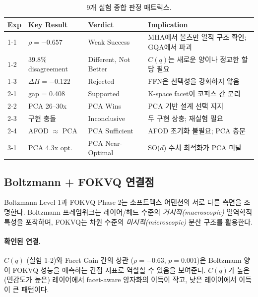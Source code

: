 \documentclass[11pt,a4paper]{article}
\begin{document}
\begin{table}[H]
\centering
\caption{9개 실험 종합 판정 매트릭스.}
\label{tab:verdict}
\begin{tabularx}{\textwidth}{ll>{\raggedright\arraybackslash}p{2.8cm}>{\raggedright\arraybackslash}X}
\toprule
\textbf{Exp} & \textbf{Key Result} & \textbf{Verdict} & \textbf{Implication} \\
\midrule
1-1 & $\rho = -0.657$ & \textcolor{partial}{Weak Success} & MHA에서 볼츠만 열적 구조 확인; GQA에서 파괴 \\
1-2 & 39.8\% disagreement & \textcolor{partial}{Different, Not Better} & $C(q)$는 새로운 양이나 정교한 할당 필요 \\
1-3 & $\Delta H = -0.122$ & \textcolor{failure}{Rejected} & FFN은 선택성을 강화하지 않음 \\
2-1 & gap = 0.408 & \textcolor{success}{Supported} & K-space facet이 코퍼스 간 분리 \\
2-2 & PCA 26--30x & \textcolor{success}{PCA Wins} & PCA 기반 설계 선택 지지 \\
2-3 & 구현 충돌 & \textcolor{partial}{Inconclusive} & 두 구현 상충; 재실험 필요 \\
2-4 & AFOD $\approx$ PCA & \textcolor{success}{PCA Sufficient} & AFOD 초기화 불필요; PCA 충분 \\
3-1 & PCA 4.3x opt. & \textcolor{success}{PCA Near-Optimal} & SO($d$) 수치 최적화가 PCA 미달 \\
\bottomrule
\end{tabularx}
\end{table}

\subsection{Boltzmann + FOKVQ 연결점}

Boltzmann Level 1과 FOKVQ Phase 2는 소프트맥스 어텐션의 서로 다른 측면을 조명한다.
Boltzmann 프레임워크는 레이어/헤드 수준의 \textit{거시적(macroscopic)} 열역학적 특성을 포착하며, FOKVQ는 차원 수준의 \textit{미시적(microscopic)} 분산 구조를 활용한다.

\paragraph{확인된 연결.}
$C(q)$ (실험 1-2)와 Facet Gain 간의 상관 ($\rho = -0.63$, $p = 0.001$)은 Boltzmann 양이 FOKVQ 성능을 예측하는 간접 지표로 역할할 수 있음을 보여준다.
$C(q)$가 높은 (민감도가 높은) 레이어에서 facet-aware 양자화의 이득이 작고, 낮은 레이어에서 이득이 큰 패턴이다.
\end{document}
